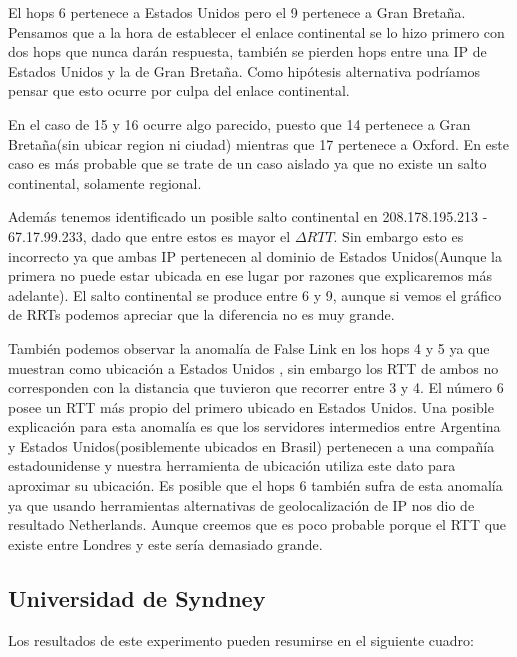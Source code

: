 El hops 6 pertenece a Estados Unidos pero el 9 pertenece a Gran Bretaña. Pensamos que a la hora de
establecer el enlace continental se lo hizo primero con dos hops que nunca darán respuesta, también se
pierden hops entre una IP de Estados Unidos y la de Gran Bretaña. Como hipótesis alternativa
podríamos pensar que esto ocurre por culpa del enlace continental.%

En el caso de 15 y 16 ocurre algo parecido, puesto que 14 pertenece a Gran Bretaña(sin ubicar region
ni ciudad) mientras que 17 pertenece a Oxford. En este caso es más probable que se trate de un caso aislado
ya que no existe un salto continental, solamente regional.

Además tenemos identificado un posible salto continental en 208.178.195.213 - 67.17.99.233, dado que entre estos es mayor el $\Delta RTT$.
Sin embargo esto es incorrecto ya que ambas IP pertenecen al dominio de Estados Unidos(Aunque la primera no puede estar ubicada
en ese lugar por razones que explicaremos más adelante). El salto continental se produce entre 6 y 9, aunque
si vemos el gráfico de RRTs podemos apreciar que la diferencia no es muy grande.

También podemos observar la anomalía de False Link en los hops 4 y 5 ya que muestran como ubicación a Estados Unidos
, sin embargo los RTT de ambos no corresponden con la distancia que tuvieron que recorrer entre 3 y 4. El número 6
posee un RTT más propio del primero ubicado en Estados Unidos. Una posible explicación para esta anomalía es que
los servidores intermedios entre Argentina y Estados Unidos(posiblemente ubicados en Brasil) pertenecen a una
compañía estadounidense y nuestra herramienta de ubicación utiliza este dato para aproximar su ubicación. Es posible
que el hops 6 también sufra de esta anomalía ya que usando herramientas alternativas de geolocalización de IP nos dio
de resultado Netherlands. Aunque creemos que es poco probable porque el RTT que existe entre Londres y este sería demasiado
grande.

\newpage

\subsection{Universidad de Syndney}

Los resultados de este experimento pueden resumirse en el siguiente cuadro:

